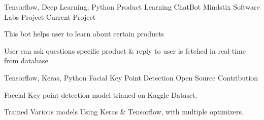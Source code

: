 

\begin{cventries}


   \cventry
    {Tensorflow, Deep Learning, Python} %
    {Product Learning ChatBot} %
    {Mindstix Software Labs Project} %
    {Current Project} %
    {
      \begin{cvitems} %
        \item {This bot helps user to learn about certain products}
        \item {User can ask questions specific product \& reply to user is fetched in real-time from database}
      \end{cvitems}
    }
  
    \cventry
    {Tensorflow, Keras, Python} %
    {Facial Key Point Detection} %
    {Open Source Contribution} %
    {} %
    {
      \begin{cvitems} %
        \item {Faceial Key point detection model trianed on Kaggle Dataset.}
        \item {Trained Various models Using Keras \& Tensorflow, with multiple optimizers.}
      \end{cvitems}
    }
  

\end{cventries}
